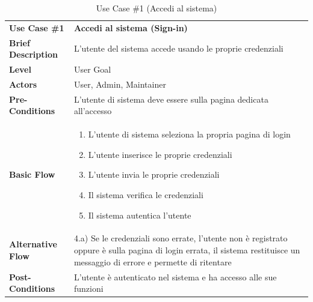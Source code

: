 
	\begin{table}[h]
		\centering
		\setlength{\arrayrulewidth}{0.8pt} %
		
		\begin{tabular}{|l p{12cm}|}
			\hline %
			
			\rowcolor{gray!25}
			\textbf{Use Case \#1} & \textbf{Accedi al sistema (Sign-in)} \\ 
			\textbf{Brief Description} & L'utente del sistema accede usando le proprie credenziali\\
			\textbf{Level} & User Goal \\ 
			\textbf{Actors} & User, Admin, Maintainer \\ 
			\textbf{Pre-Conditions} & L'utente di sistema deve essere sulla pagina dedicata all'accesso \\ %
			\textbf{Basic Flow} & \begin{enumerate}[label=\arabic*), leftmargin=*, before=\vspace{-0.7cm}, after=\vspace{-0.4cm}]
				\item L'utente di sistema seleziona la propria pagina di login
				\item L'utente inserisce le proprie credenziali 
				\item L'utente invia le proprie credenziali 
				\item Il sistema verifica le credenziali
				\item Il sistema autentica l'utente
			\end{enumerate} \\
			\textbf{Alternative Flow} & 4.a) Se le credenziali sono errate, l'utente non è registrato oppure è sulla pagina di login errata, il sistema restituisce un messaggio di errore e permette di ritentare \\ %
			\textbf{Post-Conditions} & L'utente è autenticato nel sistema e ha accesso alle sue funzioni \\ 
			
			\hline %
		\end{tabular}
		
		\vspace{0.2cm}
		\caption{Use Case \#1 (Accedi al sistema)}
	\end{table}
	
